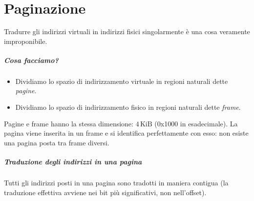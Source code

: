 \documentclass[11pt]{report}
\theoremstyle{definition}
\begin{document}
\chapter{Paginazione}
Tradurre gli indirizzi virtuali in indirizzi fisici singolarmente è una cosa veramente improponibile. 
\paragraph{Cosa facciamo?}
\begin{itemize}
	\item Dividiamo lo spazio di indirizzamento virtuale in regioni naturali dette \emph{pagine}.
	\item Dividiamo lo spazio di indirizzamento fisico in regioni naturali dette \emph{frame}.
\end{itemize}
Pagine e frame hanno la stessa dimensione: $4\,\text{KiB}$ (0x1000 in esadecimale). La pagina viene inserita in un frame e si identifica perfettamente con esso: non esiste una pagina posta tra frame diversi.
\paragraph{Traduzione degli indirizzi in una pagina} Tutti gli indirizzi posti in una pagina sono tradotti in maniera contigua (la traduzione effettiva avviene nei bit più significativi, non nell'offset).
\end{document}
